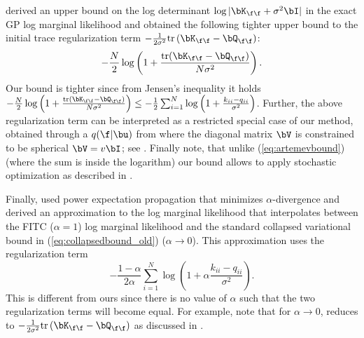 \citet{artemevburt2021cglb}
derived an upper bound on the log determinant $\log |\bK_{\f \f} + \sigma^2 \bI|$ in the exact GP log marginal likelihood and obtained the following tighter upper bound to the initial trace 
regularization term $-\frac{1}{2 \sigma^2} \text{tr}\left(  \bK_{\f\f} - \bQ_{\f\f} \right)$: 
\begin{equation}
- \frac{N}{ 2} \log\left( 1 + 
\frac{\text{tr}(\bK_{\f\f} - \bQ_{\f\f})}{N \sigma^2} \right).
\label{eq:artemevbound}
\end{equation}
Our bound is tighter since 
from Jensen's inequality 
it holds $ - \frac{N}{ 2} \log\left( 1 + 
\frac{\text{tr}(\bK_{\f\f} - \bQ_{\f\f})}{N \sigma^2} \right)
\leq - \frac{1}{2} \sum_{i=1}^N \log\left( 1 + 
\frac{k_{ii} - q_{ii}}{\sigma^2} \right)$. Further, the above regularization term
can be interpreted as a restricted special case of our method, obtained through a $q(\f | \bu)$ from  where the diagonal matrix $\bV$ is constrained to be spherical $\bV = v  \bI$; see . Finally note, 
that unlike (\ref{eq:artemevbound}) 
(where the sum is inside the logarithm) our bound allows to apply stochastic optimization
as described in .

Finally, 
\citet{Buietal2017}
used  power expectation 
propagation that minimizes  $\alpha$-divergence and derived an approximation 
to the log marginal likelihood that interpolates between the FITC ($\alpha=1$) log marginal 
likelihood \cite{Snelson2006,candela-rasmussen-05} and the standard collapsed 
variational bound in (\ref{eq:collapsedbound_old})
($\alpha \rightarrow 0$).
This approximation uses the regularization 
term 
\begin{equation}
-\frac{1-\alpha}{2 \alpha}
\sum_{i=1}^N \log\left( 1 + 
\alpha \frac{k_{ii} - q_{ii}}{\sigma^2} \right). 
\label{eq:Buiregularization}
\end{equation}
This is different from 
ours since
there is no value of $\alpha$ 
such that the two regularization terms will become equal. 
For example, note that for $\alpha \rightarrow 0$,  
reduces to $-\frac{1}{2 \sigma^2} \text{tr}\left(  \bK_{\f\f} - \bQ_{\f\f} \right)$ as discussed 
in \citet{Buietal2017}.